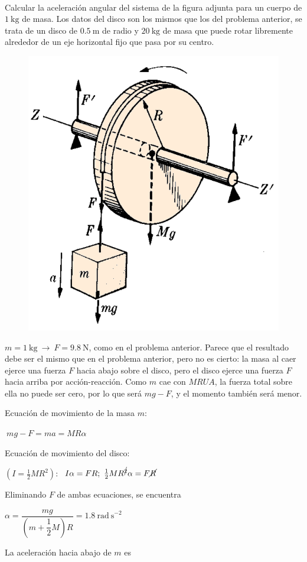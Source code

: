 \begin{prob}
\begin{multicols}{2}
$\quad$

Calcular la aceleración angular del sistema de la figura adjunta para un cuerpo de $1\ \mathrm{kg}$ de masa. Los datos del disco son los mismos que los del problema anterior, se trata de un disco de $0.5\ \mathrm{m}$  de radio y $20\ \mathrm{kg}$ de masa	que puede rotar libremente alrededor de un eje horizontal fijo que pasa por su centro.
\begin{figure}[H]
	\centering
	\includegraphics[width=.5\textwidth]{imagenes/imagenes16/T16IM12.png}
\end{figure}	
\end{multicols}
\end{prob}

$m=1\ \mathrm{kg} \ \to \ F=9.8\ \mathrm{N}$, como en el problema anterior. Parece que el resultado debe ser el mismo que en el problema anterior, pero no es cierto: la masa al caer ejerce una fuerza $F$ hacia abajo sobre el disco, pero el disco ejerce una fuerza $F$ hacia arriba por acción-reacción. Como $m$ cae con $MRUA$, la fuerza total sobre ella no puede ser cero, por lo que será $mg-F$, y el momento también será menor.

Ecuación de movimiento de la masa $m$: 

$\ mg-F=ma=MR\alpha$

Ecuación de movimiento del disco:

$(I=\frac 1 2 MR^2)$: $\ I\alpha=FR; \ \frac 1 2 M R^{\cancel{2}} \alpha=F\cancel{R}$

Eliminando $F$ de ambas ecuaciones, se encuentra 

$\alpha=\dfrac{mg}{\left( m+\dfrac 1 2 M \right)R}=1.8 \ \mathrm{rad\ s}^{-2}$

La aceleración hacia abajo de $m$ es 

